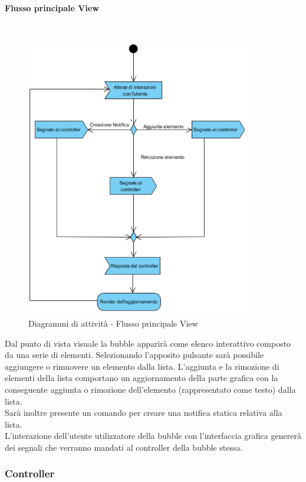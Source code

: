 \paragraph{Flusso principale View}\mbox{}\\
\nopagebreak
\begin{figure}[H]
	\centering
	\includegraphics[width=10cm]{../../documenti/SpecificaTecnica/diagrammi_img/attivita/viewmainflow.png}
	\caption{Diagrammi di attività - Flusso principale View}
\end{figure}

Dal punto di vista visuale la bubble apparirà come elenco interattivo composto da una serie di elementi. Selezionando l'apposito pulsante sarà possibile aggiungere o rimuovere un elemento dalla lista. L'aggiunta e la rimozione di elementi della lista comportano un aggiornamento della parte grafica con la conseguente aggiunta o rimozione dell'elemento (rappresentato come testo) dalla lista.\\
Sarà inoltre presente un comando per creare una notifica statica relativa alla lista.\\
L'interazione dell'utente utilizzatore della bubble con l'interfaccia grafica genererà dei segnali che verranno mandati al controller della bubble stessa.

\subsubsection{Controller}

